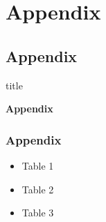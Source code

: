 \documentclass[11pt]{beamer}
\begin{document}
\section{Appendix}
\begin{frame}
	\section[Appendix]{Appendix}
	
	\begin{beamercolorbox}{title}
		\begin{center}
			\bfseries \huge Appendix
		\end{center}	
	\end{beamercolorbox}
	
\end{frame}

\begin{frame}
	\frametitle{\textbf{Appendix}}
	
		\begin{itemize}
		\item Table 1
		\item Table 2
		\item Table 3
	\end{itemize}
\end{frame}
\end{document}
